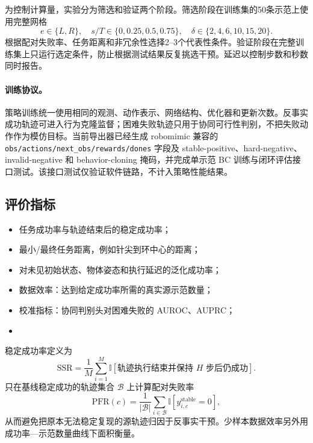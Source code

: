 为控制计算量，实验分为筛选和验证两个阶段。筛选阶段在训练集的50条示范上使用完整网格
\begin{equation}
e\in\{L,R\},\quad s/T\in\{0,0.25,0.5,0.75\},\quad
\delta\in\{2,4,6,10,15,20\}.
\end{equation}
根据配对失败率、任务距离和非冗余性选择2--3个代表性条件。验证阶段在完整训练集上只运行选定条件，防止根据测试结果反复挑选干预。延迟以控制步数和秒数同时报告。

\paragraph{训练协议。}
策略训练统一使用相同的观测、动作表示、网络结构、优化器和更新次数。反事实成功轨迹可进入行为克隆监督；困难失败轨迹只用于协同可行性判别，不把失败动作作为模仿目标。当前导出器已经生成 robomimic 兼容的 \texttt{obs/actions/next\_obs/rewards/dones} 字段及 stable-positive、hard-negative、invalid-negative 和 behavior-cloning 掩码，并完成单示范 BC 训练与闭环评估接口测试。该接口测试仅验证软件链路，不计入策略性能结果。

\subsection{评价指标}

\begin{itemize}
    \item 任务成功率与轨迹结束后的稳定成功率；
    \item 最小/最终任务距离，例如针尖到环中心的距离；
    \item 对未见初始状态、物体姿态和执行延迟的泛化成功率；
    \item 数据效率：达到给定成功率所需的真实源示范数量；
    \item 校准指标：协同判别头对困难失败的 AUROC、AUPRC；
    \item {}
\end{itemize}

稳定成功率定义为
\begin{equation}
\mathrm{SSR}=\frac{1}{M}\sum_{i=1}^{M}\mathbb{I}\!\left[\text{轨迹执行结束并保持 }H\text{ 步后仍成功}\right].
\end{equation}
只在基线稳定成功的轨迹集合 $\mathcal{B}$ 上计算配对失败率
\begin{equation}
\mathrm{PFR}(c)=\frac{1}{|\mathcal{B}|}\sum_{i\in\mathcal{B}}
\mathbb{I}\!\left[y^{\mathrm{stable}}_{i,c}=0\right],
\end{equation}
从而避免把原本无法稳定复现的源轨迹归因于反事实干预。少样本数据效率另外用成功率—示范数量曲线下面积衡量。

